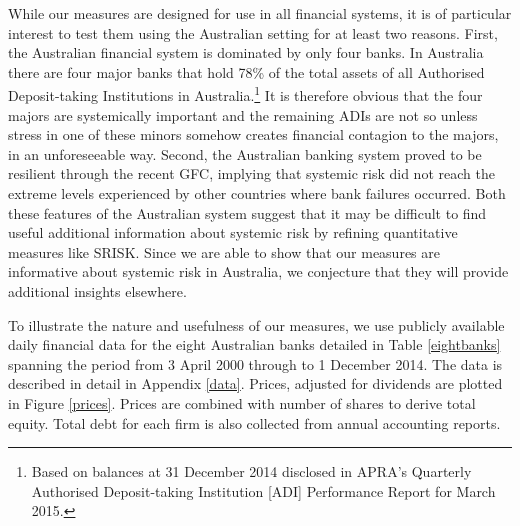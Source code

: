 \documentclass[authoryear]{elsarticle}
\newcommand{\fref}[1]{Figure \ref{#1}}
\newcommand{\tref}[1]{Table \ref{#1}}
\newcommand{\aref}[1]{Appendix \ref{#1}}
\begin{document}

While our measures are designed for use in all financial systems, it is of particular interest to test them using the Australian setting for at least two reasons. First, the Australian financial system is dominated by only four banks. In Australia there are four major banks that hold 78\% of the total assets of all Authorised Deposit-taking Institutions in  Australia.\footnote{Based on balances at 31 December 2014 disclosed in APRA's Quarterly Authorised Deposit-taking Institution [ADI] Performance Report for March 2015.} It is therefore obvious that the four majors are systemically important and the remaining ADIs are not so unless stress in one of these minors somehow creates financial contagion to the majors, in an unforeseeable way. Second, the Australian banking system proved to be resilient through the recent GFC, implying that systemic risk did not reach the extreme levels experienced by other countries where bank failures occurred. Both these features of the Australian system suggest that it may be difficult to find useful additional information about systemic risk by refining quantitative measures like SRISK. Since we are able to show that our measures are informative about systemic risk in Australia, we conjecture that they will provide additional insights elsewhere.  

To illustrate the nature and usefulness of our measures, we use publicly available daily financial data for the eight Australian banks detailed in \tref{eightbanks} spanning the period from  3 April 2000 through to 1 December 2014.  The data is described in detail in \aref{data}.  Prices, adjusted for dividends are plotted in \fref{prices}.  Prices are combined with number of shares to derive total equity. Total debt for each firm is also collected from annual accounting reports. %
\end{document}
